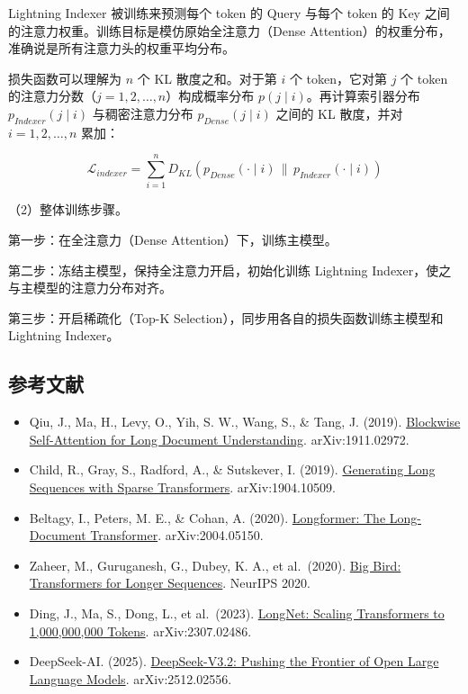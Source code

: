 Lightning Indexer 被训练来预测每个 token 的 Query 与每个 token 的 Key 之间的注意力权重。训练目标是模仿原始全注意力（Dense Attention）的权重分布，准确说是所有注意力头的权重平均分布。

损失函数可以理解为 \(n\) 个 KL 散度之和。对于第 \(i\) 个 token，它对第 \(j\) 个 token 的注意力分数（\(j = 1, 2, \ldots, n\)）构成概率分布 \(p(j \mid i)\)。再计算索引器分布 \(p_{Indexer}(j \mid i)\) 与稠密注意力分布 \(p_{Dense}(j \mid i)\) 之间的 KL 散度，并对 \(i = 1, 2, \ldots, n\) 累加：

\[
\mathcal{L}_{indexer}
= \sum_{i=1}^{n} D_{KL}\left(p_{Dense}(\cdot \mid i) \,\|\, p_{Indexer}(\cdot \mid i)\right)
\]

（2）整体训练步骤。

第一步：在全注意力（Dense Attention）下，训练主模型。

第二步：冻结主模型，保持全注意力开启，初始化训练 Lightning Indexer，使之与主模型的注意力分布对齐。

第三步：开启稀疏化（Top-K Selection），同步用各自的损失函数训练主模型和 Lightning Indexer。

\hypertarget{ux53c2ux8003ux6587ux732e-96}{%
\subsection{参考文献}\label{ux53c2ux8003ux6587ux732e-96}}

\begin{itemize}
\tightlist
\item
  Qiu, J., Ma, H., Levy, O., Yih, S. W., Wang, S., \& Tang, J. (2019). \href{https://arxiv.org/abs/1911.02972}{Blockwise Self-Attention for Long Document Understanding}. arXiv:1911.02972.
\item
  Child, R., Gray, S., Radford, A., \& Sutskever, I. (2019). \href{https://arxiv.org/abs/1904.10509}{Generating Long Sequences with Sparse Transformers}. arXiv:1904.10509.
\item
  Beltagy, I., Peters, M. E., \& Cohan, A. (2020). \href{https://arxiv.org/abs/2004.05150}{Longformer: The Long-Document Transformer}. arXiv:2004.05150.
\item
  Zaheer, M., Guruganesh, G., Dubey, K. A., et al.~(2020). \href{https://arxiv.org/abs/2007.14062}{Big Bird: Transformers for Longer Sequences}. NeurIPS 2020.
\item
  Ding, J., Ma, S., Dong, L., et al.~(2023). \href{https://arxiv.org/abs/2307.02486}{LongNet: Scaling Transformers to 1,000,000,000 Tokens}. arXiv:2307.02486.
\item
  DeepSeek-AI. (2025). \href{https://arxiv.org/abs/2512.02556}{DeepSeek-V3.2: Pushing the Frontier of Open Large Language Models}. arXiv:2512.02556.
\end{itemize}

